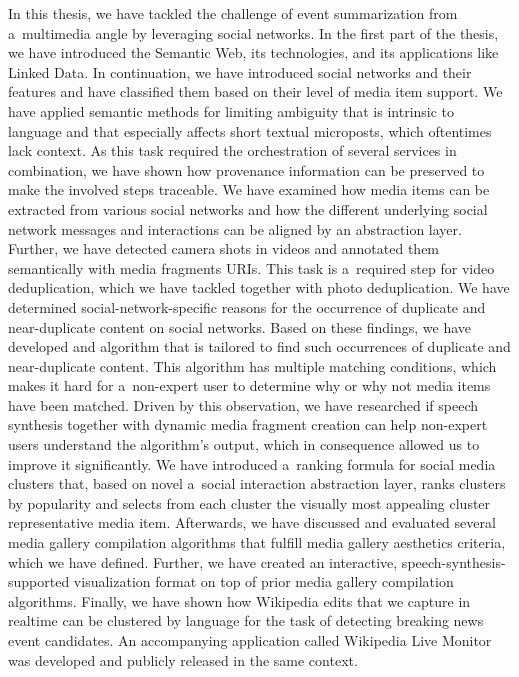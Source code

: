 In this thesis, we have tackled the challenge of event summarization
from a~multimedia angle by leveraging social networks.
In the first part of the thesis,
we have introduced the Semantic Web,
its technologies, and its applications like Linked Data.
In continuation, we have introduced social networks
and their features and have classified them
based on their level of media item support.
We have applied semantic methods for limiting ambiguity
that is intrinsic to language and that especially affects
short textual microposts, which oftentimes lack context.
As this task required the orchestration of several services
in combination, we have shown how provenance information
can be preserved to make the involved steps traceable.
We have examined how media items can be extracted from 
various social networks and how the different
underlying social network messages and interactions
can be aligned by an abstraction layer.
Further, we have detected camera shots in videos and 
annotated them semantically with media fragments URIs.
This task is a~required step for video deduplication,
which we have tackled together with photo deduplication.
We have determined social-network-specific reasons
for the occurrence of duplicate and near-duplicate content
on social networks.
Based on these findings, we have developed and algorithm
that is tailored to find such occurrences of duplicate
and near-duplicate content.
This algorithm has multiple matching conditions,
which makes it hard for a~non-expert user to determine
why or why not media items have been matched.
Driven by this observation, we have researched
if speech synthesis together with dynamic media fragment creation
can help non-expert users understand the algorithm's output,
which in consequence allowed us to improve it significantly.
We have introduced a~ranking formula for social media clusters
that, based on novel a~social interaction abstraction layer,
ranks clusters by popularity and selects from each cluster
the visually most appealing cluster representative media item.
Afterwards, we have discussed and evaluated several
media gallery compilation algorithms
that fulfill media gallery aesthetics criteria,
which we have defined.
Further, we have created an interactive,
speech-synthesis-supported visualization format
on top of prior media gallery compilation algorithms.
Finally, we have shown how Wikipedia edits
that we capture in realtime can be clustered by language
for the task of detecting breaking news event candidates.
An accompanying application called Wikipedia Live Monitor
was developed and publicly released in the same context.

